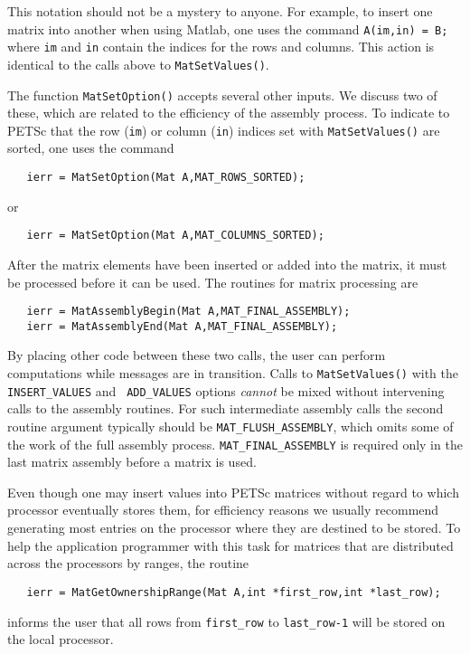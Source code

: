 This notation should not be a mystery to anyone. For example, 
to insert one matrix into another when using Matlab, one uses the command 
{\tt A(im,in) = B;} where {\tt im} and {\tt in} contain the indices for the
rows and columns. This action is identical to the calls above to 
{\tt MatSetValues()}.

The function {\tt MatSetOption()} accepts several other inputs.  We
discuss two of these, which are related to the efficiency of the
assembly process.  To indicate to PETSc that the row ({\tt im}) or
column ({\tt in}) indices set with {\tt MatSetValues()} are sorted,
one uses the command  
\begin{verbatim}
   ierr = MatSetOption(Mat A,MAT_ROWS_SORTED);
\end{verbatim}
or 
\begin{verbatim}
   ierr = MatSetOption(Mat A,MAT_COLUMNS_SORTED);
\end{verbatim}

After the matrix elements have been inserted or added into the matrix, 
it must be processed before it can be used. The routines for matrix
processing are  
\begin{verbatim}
   ierr = MatAssemblyBegin(Mat A,MAT_FINAL_ASSEMBLY);
   ierr = MatAssemblyEnd(Mat A,MAT_FINAL_ASSEMBLY);
\end{verbatim}
By placing other code between these two calls, the user can perform
computations while messages are in transition.
Calls to {\tt MatSetValues()} with the {\tt INSERT\_VALUES} and {\tt
ADD\_VALUES} options {\em cannot} be mixed without intervening calls to
the assembly routines.  For such intermediate assembly calls the
second routine argument  typically should be {\tt MAT\_FLUSH\_ASSEMBLY},
 which omits some of the work of the full 
assembly process.  {\tt MAT\_FINAL\_ASSEMBLY}  is
required only in the last matrix assembly before a matrix is used.

Even though one may insert values into PETSc matrices without regard
to which processor eventually stores them, for efficiency
reasons we usually recommend generating most entries on the
processor where they are destined to be stored.  To help the
application programmer with this task for matrices that are
distributed across the processors by ranges, the routine
\begin{verbatim}
   ierr = MatGetOwnershipRange(Mat A,int *first_row,int *last_row);
\end{verbatim}
informs the user that all rows from {\tt first\_row} to 
{\tt last\_row-1} will be stored on the local processor.

